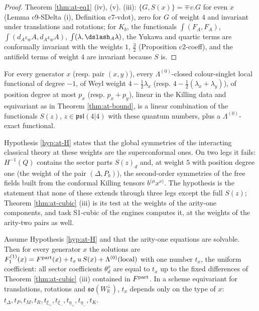 \begin{proof}
Theorem \ref{thm:at-eq1} (iv), (v). (iii): $\{G,S(x)\}=\mp v.G$ for even $x$ (Lemma c9-SDelta (i), Definition c7-vdot), zero for $G$ of weight $4$ and invariant under translations and rotations; for $K_b$, the functionals $\int(F_A,F_A)$, $\int(d_A\iota_wA,d_A\iota_wA)$, $\int(\lambda,\dslash_A\lambda)$, the Yukawa and quartic terms are conformally invariant with the weights $1$, $\tfrac32$ (Proposition c2-coeff), and the antifield terms of weight $4$ are invariant because $S$ is.
\end{proof}

\begin{hypothesis}
\label{hyp:at-H}
For every generator $x$ (resp. pair $(x,y)$), every $\Lambda^{(0)}$-closed colour-singlet local functional of degree $-1$, of Weyl weight $4-\tfrac12\lambda_x$ (resp. $4-\tfrac12(\lambda_x+\lambda_y)$), of position degree at most $p_x$ (resp. $p_x+p_y$), linear in the Killing data and equivariant as in Theorem \ref{thm:at-bound}, is a linear combination of the functionals $S(z)$, $z\in\mathfrak{psl}(4|4)$ with these quantum numbers, plus a $\Lambda^{(0)}$-exact functional.
\end{hypothesis}

\begin{remark}
\label{rem:at-H}
Hypothesis \ref{hyp:at-H} states that the global symmetries of the interacting classical theory at these weights are the superconformal ones. On two legs it fails: $H^{-1}(Q)$ contains the sector parts $S(z)_d$ and, at weight $5$ with position degree one (the weight of the pair $(\Delta,P_b)$), the second-order symmetries of the free fields built from the conformal Killing tensors $b^{(\mu}x^{\nu)}$. The hypothesis is the statement that none of these extends through three legs except the full $S(z)$; Theorem \ref{thm:at-cubic} (iii) is its test at the weights of the arity-one components, and task S1-cubic of the engines computes it, at the weights of the arity-two pairs as well.
\end{remark}

\begin{theorem}
\label{thm:at-H}
Assume Hypothesis \ref{hyp:at-H} and that the arity-one equations are solvable. Then for every generator $x$ the solutions are $F_1^{(1)}(x)=F^{\rm part}(x)+t_x\,u\,S(x)+\Lambda^{(0)}(\text{local})$ with one number $t_x$, the uniform coefficient: all sector coefficients $\theta^x_d$ are equal to $t_x$ up to the fixed differences of Theorem \ref{thm:at-cubic} (iii) contained in $F^{\rm part}$. In a scheme equivariant for translations, rotations and $\mathfrak{so}(W^\perp_{\mathbb R})$, $t_x$ depends only on the type of $x$: $t_\Delta,t_P,t_M,t_R,t_{\xi_+},t_{\xi_-},t_{\eta_+},t_{\eta_-},t_K$.
\end{theorem}

